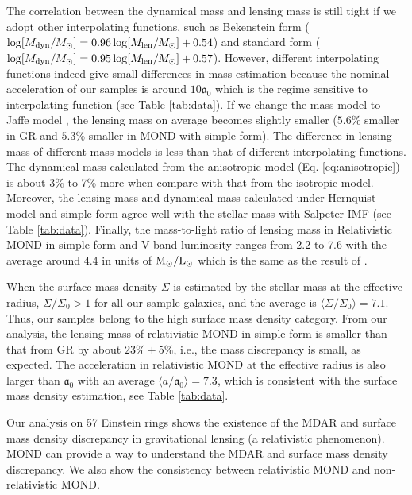 \documentclass[fleqn,usenatbib,useAMS]{mnras}
\begin{document}
    The correlation between the dynamical mass and lensing mass is still tight if we adopt other interpolating functions, such as Bekenstein form ($\log[M_{\rm dyn}/M_{\odot}]=0.96\log[M_{\rm len}/M_{\odot}]+0.54$) and standard form ($\log[M_{\rm dyn}/M_{\odot}]=0.95\log[M_{\rm len}/M_{\odot}]+0.57$).
    However, different interpolating functions indeed give small differences in mass estimation because the nominal acceleration of our samples is around $10\mathfrak{a}_0$ which is the regime sensitive to interpolating function (see Table \ref{tab:data}).
    If we change the mass model to Jaffe model \citep{Jaffe83}, the lensing mass on average becomes slightly smaller ($5.6\%$ smaller in GR and $5.3\%$ smaller in MOND with simple form).
    The difference in lensing mass of different mass models is less than that of different interpolating functions.
    The dynamical mass calculated from the anisotropic model (Eq. \ref{eq:anisotropic}) is about 3\% to 7\% more when compare with that from the isotropic model.
    Moreover, the lensing mass and dynamical mass calculated under Hernquist model and simple form agree well with the stellar mass with Salpeter IMF (see Table \ref{tab:data}).
    Finally, the mass-to-light ratio of lensing mass in Relativistic MOND in simple form and V-band luminosity ranges from 2.2 to 7.6 with the average around 4.4 in units of ${\rm M}_{\odot}/{\rm L}_{\odot}$ which is the same as the result of \cite{Sanders14}.

    When the surface mass density $\Sigma$ is estimated by the stellar mass at the effective radius, $\Sigma/\Sigma_0>1$ for all our sample galaxies, and the average is $\langle\Sigma/\Sigma_0\rangle=7.1$.
    Thus, our samples belong to the high surface mass density category.
    From our analysis, the lensing mass of relativistic MOND in simple form is smaller than that from GR by about $23\%\pm5\%$, i.e., the mass discrepancy is small, as expected.
    The acceleration in relativistic MOND at the effective radius is also larger than $\mathfrak{a}_0$ with an average
    $\langle a/\mathfrak{a}_0\rangle=7.3$, which is consistent with the surface mass density estimation, see Table \ref{tab:data}.

    Our analysis on 57 Einstein rings shows the existence of the MDAR and surface mass density discrepancy in gravitational lensing (a relativistic phenomenon).
    MOND can provide a way to understand the MDAR and surface mass density discrepancy.
    We also show the consistency between relativistic MOND and non-relativistic MOND.
\end{document}

